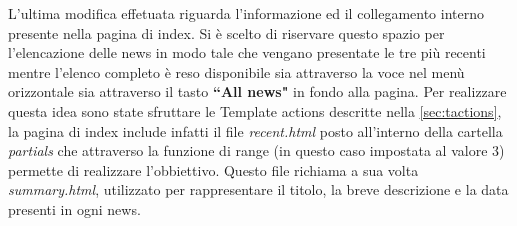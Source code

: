 \documentclass[target=bach,aauheader=]{thud}
\begin{document}
\newline
L'ultima modifica effetuata riguarda l'informazione ed il collegamento interno presente nella pagina di index. Si è scelto di riservare questo spazio per l'elencazione delle news in modo tale che vengano presentate le tre più recenti
mentre l'elenco completo è reso disponibile sia attraverso la voce nel menù orizzontale sia attraverso il tasto \textbf{``All news"} in fondo alla pagina. 
Per realizzare questa idea sono state sfruttare le Template actions descritte nella \cref{sec:tactions}, la pagina di index include infatti il file \textit{recent.html} posto all'interno della cartella \textit{partials} che attraverso la funzione di range (in questo caso impostata al valore 3) permette di realizzare l'obbiettivo. 
Questo file richiama a sua volta \textit{summary.html}, utilizzato per rappresentare il titolo, la breve descrizione e la data presenti in ogni news. 
\end{document}
